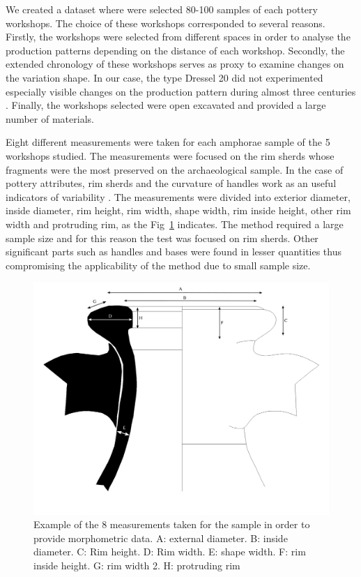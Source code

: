 \documentclass[review]{elsarticle}
\begin{document}
We created a dataset where were selected 80-100 samples of each pottery workshops. The choice of these workshops corresponded to several reasons. Firstly, the workshops were selected from different spaces in order to analyse the production patterns depending on the distance of each workshop. Secondly, the extended chronology of these workshops serves as proxy to examine changes on the variation shape. In our case, the type Dressel 20 did not experimented especially visible changes on the production pattern during almost three centuries \citep{berni_dressel_2016}. Finally, the workshops selected were open excavated and provided a large number of materials.   

Eight different measurements were taken for each amphorae sample of the 5 workshops studied. The measurements were focused on the rim sherds whose fragments were the most preserved on the archaeological sample. In the case of pottery attributes, rim sherds and the curvature of handles work as an useful indicators of variability \citep{berni_millet_epigrafianforica_2008}.
The measurements were divided into exterior diameter, inside diameter, rim height, rim width, shape width, rim inside height, other rim width and protruding rim, as the Fig~\ref{mesures} indicates. The method required a large sample size and for this reason the test was focused on rim sherds. Other significant parts such as handles and bases were found in lesser quantities thus compromising the applicability of the method due to small sample size.

\begin{figure}[htp]
	\centering
\includegraphics[scale=0.10]{mesures.png}
\caption{Example of the 8 measurements taken for the sample in order to provide morphometric data. A: external diameter. B: inside diameter. C: Rim height. D: Rim width. E: shape width. F: rim inside height. G: rim width 2. H: protruding rim}
\label{mesures}
\end{figure} 
\end{document}
